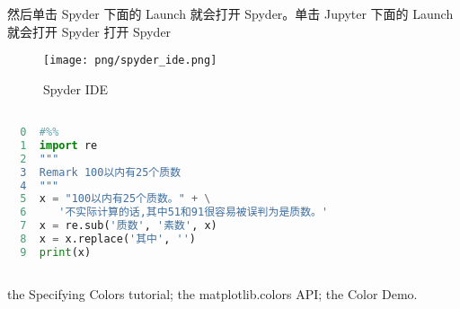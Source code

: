 \documentclass[main.tex]{subfiles}
\begin{document}
	然后单击 Spyder 下面的 Launch 就会打开 Spyder。单击 Jupyter 下面的 Launch 就会打开 Spyder
打开 Spyder
\begin{figure}[h]
	\centering
	\texttt{[image: png/spyder\_ide.png]}
	\caption{Spyder IDE}
	\label{fig:2.3.1}
\end{figure}

\begin{small}
\begin{spacing}{0.8}
	\begin{lstlisting}[language=Python]

  0  #%%		
  1  import re
  2  """
  3  Remark 100以内有25个质数
  4  """		
  5  x = "100以内有25个质数。" + \
  6		'不实际计算的话,其中51和91很容易被误判为是质数。'
  7  x = re.sub('质数', '素数', x)
  8  x = x.replace('其中', '')
  9  print(x)
		
\end{lstlisting}
\end{spacing}
\end{small}

the Specifying Colors tutorial;
the matplotlib.colors API;
the Color Demo.


\begin{small}

\end{small}
\end{document}
